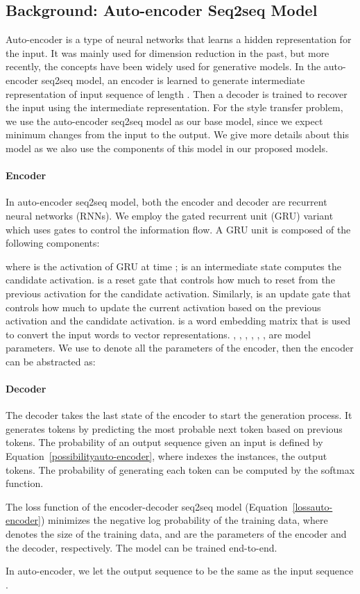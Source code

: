\documentclass[letterpaper]{article} \usepackage{aaai18}  \usepackage{times}  \usepackage{helvet}  \usepackage{courier}  \usepackage{url}  \usepackage{graphicx}  \usepackage{amsmath}
\begin{document}
\subsection{Background: Auto-encoder Seq2seq Model}
Auto-encoder \cite{rumelhart1985learning} is a type of neural networks that 
learns a hidden representation for the input. It was mainly used for dimension reduction 
in the past, but more recently, the concepts have been widely used for generative models. 
In the auto-encoder seq2seq model, an encoder is learned to generate intermediate representation 
of input sequence  of length . Then a decoder is trained to 
recover the input  using the intermediate representation. 
For the style transfer problem, we use the auto-encoder seq2seq model as our base model, since we 
expect minimum changes from the input to the output. We give more details about this model 
as we also use the components of this model in our proposed models.


\paragraph{Encoder} In auto-encoder seq2seq model, both the encoder and decoder are recurrent neural networks (RNNs).
We employ the gated recurrent unit (GRU) variant which uses gates to control the information flow.
A GRU unit is composed of the following components:
{\small

}where  is the activation of GRU at time ;  is an intermediate state computes the candidate activation. 
 is a reset gate that controls how much to reset from the previous activation for the candidate activation. 
Similarly,  is an update gate that controls how much to update the current activation based on the previous 
activation and the candidate activation. 
 is a word embedding matrix that is used to convert the input words to vector representations.  
, , , , , ,  are model parameters. We use  to denote 
all the parameters of the encoder,  then the encoder can be abstracted as:

\paragraph{Decoder} The decoder takes the last state of the encoder to start the generation process. 
It generates tokens by predicting the most probable next token based on previous tokens.
The probability of an output sequence given an input  is defined by Equation~\ref{possibilityauto-encoder}, 
where  indexes the instances,  the output tokens. 
The probability  of generating each token can be computed by the softmax function.
{\small

}The loss function of the encoder-decoder seq2seq model (Equation~\ref{lossauto-encoder}) minimizes the negative log probability of the training data, 
where  denotes the size of the training data, 
 and  are the parameters of the encoder and the decoder, respectively. The model can be trained end-to-end.
{\small

}In auto-encoder, we let the output sequence  to be the same as the input sequence .
\end{document}
